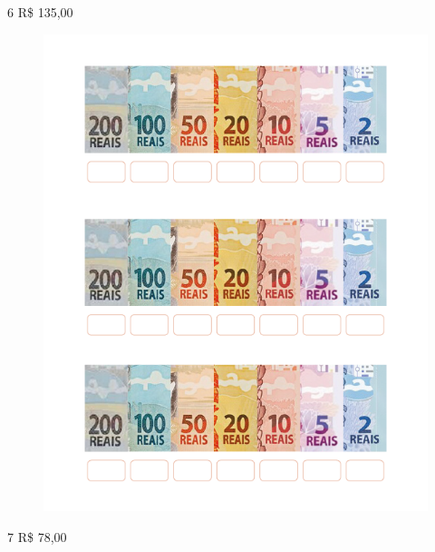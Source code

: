 

\pagebreak
\num{6} R\$ 135,00

\begin{figure}[htpb!]
\includegraphics[width=.9\textwidth]{./media/image69.png}
\end{figure}



\pagebreak
\num{7} R\$ 78,00

